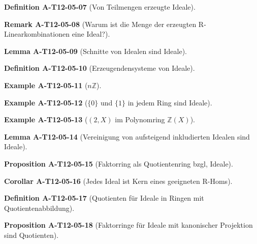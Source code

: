 \documentclass[10pt, letterpaper]{article}
\newcommand{\Z}{\mathbb{Z}}
\newcommand{\CustomHeading}[3]{%
  \par\medskip\noindent%
  \textbf{#1 #2} \textnormal{(#3)}.\enskip%
}
\newenvironment{DEF}[2]{\CustomHeading{Definition}{#1}{#2}}{}
\newenvironment{PROP}[2]{\CustomHeading{Proposition}{#1}{#2}}{}
\newenvironment{LEM}[2]{\CustomHeading{Lemma}{#1}{#2}}{}
\newenvironment{KORO}[2]{\CustomHeading{Corollar}{#1}{#2}}{}
\newenvironment{REM}[2]{\CustomHeading{Remark}{#1}{#2}}{}
\newenvironment{EXA}[2]{\CustomHeading{Example}{#1}{#2}}{}
\begin{document}
\begin{DEF}{A-T12-05-07}{Von Teilmengen erzeugte Ideale}
\end{DEF}

\begin{REM}{A-T12-05-08}{Warum ist die Menge der erzeugten R-Linearkombinationen eine Ideal?}
\end{REM}

\begin{LEM}{A-T12-05-09}{Schnitte von Idealen sind Ideale}
\end{LEM}

\begin{DEF}{A-T12-05-10}{Erzeugendensysteme von Ideale}
\end{DEF}

\begin{EXA}{A-T12-05-11}{$n\Z$}
\end{EXA}

\begin{EXA}{A-T12-05-12}{$\{0\}$ und $\{1\}$ in jedem Ring sind Ideale}
\end{EXA}

\begin{EXA}{A-T12-05-13}{$(2,X)$ im Polynomring $\Z(X)$}
\end{EXA}

\begin{LEM}{A-T12-05-14}{Vereinigung von aufsteigend inkludierten Idealen sind Ideale}
\end{LEM}

\begin{PROP}{A-T12-05-15}{Faktorring als Quotientenring bzgl, Ideale}
\end{PROP}

\begin{KORO}{A-T12-05-16}{Jedes Ideal ist Kern eines geeigneten R-Homs}
\end{KORO}

\begin{DEF}{A-T12-05-17}{Quotienten für Ideale in Ringen mit Quotientenabbildung}
\end{DEF}

\begin{PROP}{A-T12-05-18}{Faktorringe für Ideale mit kanonischer Projektion sind Quotienten}
\end{PROP}
\end{document}
